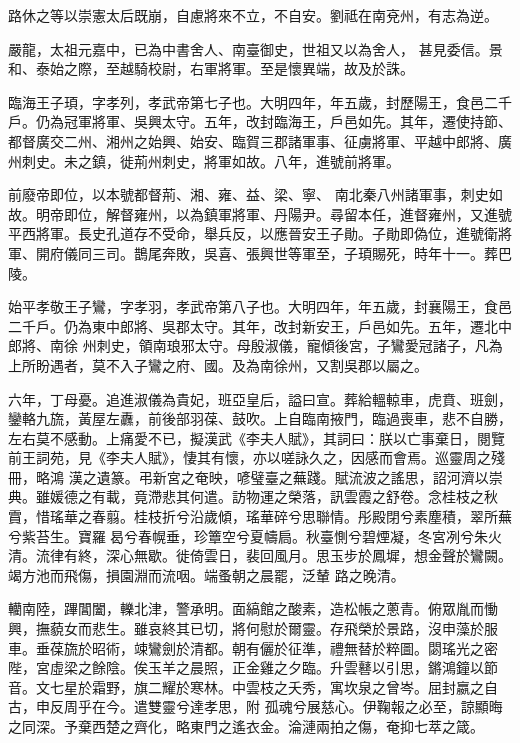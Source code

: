 \begin{pinyinscope}
 路休之等以崇憲太后既崩，自慮將來不立，不自安。劉祗在南兗州，有志為逆。



 嚴龍，太祖元嘉中，已為中書舍人、南臺御史，世祖又以為舍人，
 甚見委信。景和、泰始之際，至越騎校尉，右軍將軍。至是懷異端，故及於誅。



 臨海王子頊，字孝列，孝武帝第七子也。大明四年，年五歲，封歷陽王，食邑二千戶。仍為冠軍將軍、吳興太守。五年，改封臨海王，戶邑如先。其年，遷使持節、都督廣交二州、湘州之始興、始安、臨賀三郡諸軍事、征虜將軍、平越中郎將、廣州刺史。未之鎮，徙荊州刺史，將軍如故。八年，進號前將軍。



 前廢帝即位，以本號都督荊、湘、雍、益、梁、寧、
 南北秦八州諸軍事，刺史如故。明帝即位，解督雍州，以為鎮軍將軍、丹陽尹。尋留本任，進督雍州，又進號平西將軍。長史孔道存不受命，舉兵反，以應晉安王子勛。子勛即偽位，進號衛將軍、開府儀同三司。鵲尾奔敗，吳喜、張興世等軍至，子頊賜死，時年十一。葬巴陵。



 始平孝敬王子鸞，字孝羽，孝武帝第八子也。大明四年，年五歲，封襄陽王，食邑二千戶。仍為東中郎將、吳郡太守。其年，改封新安王，戶邑如先。五年，遷北中郎將、南徐
 州刺史，領南琅邪太守。母殷淑儀，寵傾後宮，子鸞愛冠諸子，凡為上所盼遇者，莫不入子鸞之府、國。及為南徐州，又割吳郡以屬之。



 六年，丁母憂。追進淑儀為貴妃，班亞皇后，謚曰宣。葬給轀輬車，虎賁、班劍，鑾輅九旒，黃屋左纛，前後部羽葆、鼓吹。上自臨南掖門，臨過喪車，悲不自勝，左右莫不感動。上痛愛不已，擬漢武《李夫人賦》，其詞曰：朕以亡事棄日，閱覽前王詞苑，見《李夫人賦》，悽其有懷，亦以嗟詠久之，因感而會焉。巡靈周之殘冊，略鴻
 漢之遺篆。弔新宮之奄映，喭璧臺之蕪踐。賦流波之謠思，詔河濟以崇典。雖媛德之有載，竟滯悲其何遣。訪物運之榮落，訊雲霞之舒卷。念桂枝之秋霣，惜瑤華之春翦。桂枝折兮沿歲傾，瑤華碎兮思聯情。彤殿閉兮素塵積，翠所蕪兮紫苔生。寶羅曷兮春幌垂，珍簟空兮夏幬扃。秋臺惻兮碧煙凝，冬宮冽兮朱火清。流律有終，深心無歇。徙倚雲日，裴回風月。思玉步於鳳墀，想金聲於鸞闕。竭方池而飛傷，損園淵而流咽。端蚤朝之晨罷，泛輦
 路之晚清。



 轥南陸，蹕閶闔，轢北津，警承明。面縞館之酸素，造松帳之蔥青。俯眾胤而慟興，撫藐女而悲生。雖哀終其已切，將何慰於爾靈。存飛榮於景路，沒申藻於服車。垂葆旒於昭術，竦鸞劍於清都。朝有儷於征準，禮無替於粹圖。閟瑤光之密陛，宮虛梁之餘陰。俟玉羊之晨照，正金雞之夕臨。升雲鼛以引思，鏘鴻鐘以節音。文七星於霜野，旗二耀於寒林。中雲枝之夭秀，寓坎泉之曾岑。屈封嬴之自古，申反周乎在今。遣雙靈兮達孝思，附
 孤魂兮展慈心。伊鞠報之必至，諒顯晦之同深。予棄西楚之齊化，略東門之遙衣金。淪漣兩拍之傷，奄抑七萃之箴。




\end{pinyinscope}
